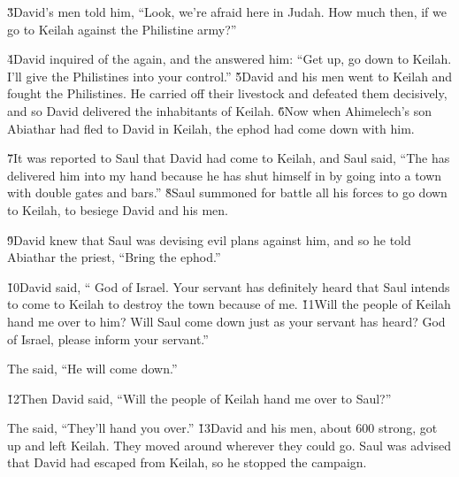 \v{3}David's men told him, ``Look, we're afraid here in Judah. How much then, if we go to Keilah against the Philistine army?''

\v{4}David inquired of the  again, and the  answered him: ``Get up, go down to Keilah. I'll give the Philistines into your control.'' \v{5}David and his men went to Keilah and fought the Philistines. He carried off their livestock and defeated them decisively, and so David delivered the inhabitants of Keilah. \v{6}Now when Ahimelech's son Abiathar had fled to David in Keilah, the ephod had come down with him.

\v{7}It was reported to Saul that David had come to Keilah, and Saul said, ``The  has delivered him into my hand because he has shut himself in by going into a town with double gates and bars.'' \v{8}Saul summoned for battle all his forces to go down to Keilah, to besiege David and his men.

\v{9}David knew that Saul was devising evil plans against him, and so he told Abiathar the priest, ``Bring the ephod.''

\v{10}David said, `` God of Israel. Your servant has definitely heard that Saul intends to come to Keilah to destroy the town because of me. \v{11}Will the people of Keilah hand me over to him? Will Saul come down just as your servant has heard?  God of Israel, please inform your servant.''

The  said, ``He will come down.''

\v{12}Then David said, ``Will the people of Keilah hand me over to Saul?''

The  said, ``They'll hand you over.'' \v{13}David and his men, about 600 strong, got up and left Keilah. They moved around wherever they could go. Saul was advised that David had escaped from Keilah, so he stopped the campaign.

